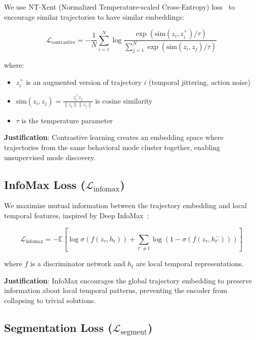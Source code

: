 \documentclass{article}
\begin{document}
We use NT-Xent (Normalized Temperature-scaled Cross-Entropy) loss~\cite{chen2020simple} to encourage similar trajectories to have similar embeddings:

\begin{equation}
    \mathcal{L}_{\text{contrastive}} = -\frac{1}{N} \sum_{i=1}^{N} \log \frac{\exp(\text{sim}(z_i, z_i^+) / \tau)}{\sum_{j=1}^{N} \exp(\text{sim}(z_i, z_j) / \tau)}
\end{equation}

where:
\begin{itemize}
    \item $z_i^+$ is an augmented version of trajectory $i$ (temporal jittering, action noise)
    \item $\text{sim}(z_i, z_j) = \frac{z_i^\top z_j}{\|z_i\| \|z_j\|}$ is cosine similarity
    \item $\tau$ is the temperature parameter
\end{itemize}

\textbf{Justification}: Contrastive learning creates an embedding space where trajectories from the same behavioral mode cluster together, enabling unsupervised mode discovery.

\subsection{InfoMax Loss ($\mathcal{L}_{\text{infomax}}$)}

We maximize mutual information between the trajectory embedding and local temporal features, inspired by Deep InfoMax~\cite{hjelm2018learning}:

\begin{equation}
    \mathcal{L}_{\text{infomax}} = -\mathbb{E}\left[\log \sigma(f(z_\tau, h_t)) + \sum_{t' \neq t} \log(1 - \sigma(f(z_\tau, h_{t'}^-)))\right]
\end{equation}

where $f$ is a discriminator network and $h_t$ are local temporal representations.

\textbf{Justification}: InfoMax encourages the global trajectory embedding to preserve information about local temporal patterns, preventing the encoder from collapsing to trivial solutions.

\subsection{Segmentation Loss ($\mathcal{L}_{\text{segment}}$)}
\end{document}
